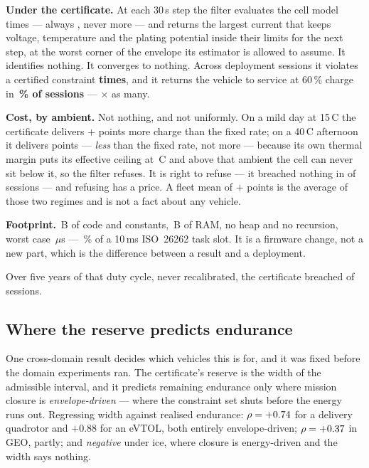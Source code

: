 \documentclass[11pt,letterpaper]{article}
\theoremstyle{definition}
\theoremstyle{remark}
\newcommand{\SI}[2]{#1\,#2}
\newcommand{\degreeCelsius}{\degC}
\newcommand{\degC}{\ifmmode{^\circ}\mathrm{C}\else\textdegree C\fi}
\begin{document}
\textbf{Under the certificate.} At each 30\,s step the filter evaluates the cell
model \evalCharge{} times --- always \evalCharge, never more --- and returns the largest current
that keeps voltage, temperature and the plating potential inside their limits for the next step,
at the worst corner of the envelope its estimator is allowed to assume. It identifies nothing. It
converges to nothing. Across \bThreeTrials{} deployment sessions it violates a certified
constraint \textbf{\bThreeZgViol{} times}, and it returns the vehicle to service at 60\,\% charge
in \textbf{\gtReachSixtyZg\,\% of sessions} --- \gtReachSixtyRatio$\times$ as many.

\textbf{Cost, by ambient.} Not nothing, and not uniformly. On a mild day at \SI{15}{\degreeCelsius} the
certificate delivers $+$\gtAmbFifteen{} points more charge than the fixed rate; on a \SI{40}{\degreeCelsius}
afternoon it delivers \gtAmbForty{} points --- \emph{less} than the fixed rate, not more ---
because its own thermal margin puts its effective ceiling at \SI{\gtCeiling}{\degreeCelsius} and above that
ambient the cell can never sit below it, so the filter refuses. It is right to refuse --- it breached nothing in
\gtViol{} of \gtTrials{} sessions --- and refusing has a price. A fleet mean of
$+$\gtMean{} points is the average of those two regimes and is not a fact about any vehicle.

\textbf{Footprint.} \fwText\,B of code and constants,
\fwRam\,B of RAM, no heap and no recursion, worst case \fwUsMax\,$\mu$s --- \fwSlotPct\,\% of a
10\,ms ISO~26262 task slot. It is a firmware change, not a new part, which is the difference
between a result and a deployment.

Over five years of that duty cycle, never recalibrated, the certificate breached
\gRoboViol{} of \gRoboSessions{} sessions.

\subsection{Where the reserve predicts endurance}\label{sec:cross}

One cross-domain result decides which vehicles this is for, and it was fixed before the domain
experiments ran. The certificate's reserve is the width of the admissible interval, and it
predicts remaining endurance only where mission closure is \emph{envelope-driven} --- where the
constraint set shuts before the energy runs out. Regressing width against realised endurance:
$\rho = +0.74$ for a delivery quadrotor and $+0.88$ for an eVTOL, both entirely
envelope-driven; $\rho = +0.37$ in GEO, partly; and \emph{negative} under ice, where closure is
energy-driven and the width says nothing.
\end{document}
